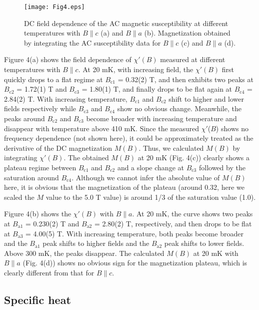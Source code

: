 \documentclass[aps,twocolumn,superscriptaddress,showpacs]{revtex4-1}
\begin{document}
\begin{figure}
\texttt{[image: Fig4.eps]}
\caption{DC field dependence of the AC magnetic susceptibility at different temperatures with $B \parallel c$ (a) and $B \parallel a$ (b). Magnetization obtained by integrating the AC susceptibility data for $B \parallel c$ (c) and $B \parallel a$ (d).}
\label{ACH}
\end{figure}

Figure 4(a) shows the field dependence of $\chi'(B)$ measured at different temperatures with $B \parallel c$. At 20 mK, with increasing field, the $\chi'(B)$ first quickly drops to a flat regime at $B_{\text{c1}}$ = 0.32(2) T, and then exhibits two peaks at $B_{\text{c2}}$ = 1.72(1) T and $B_{\text{c3}}$ = 1.80(1) T, and finally drops to be flat again at $B_{\text{c4}}$ = 2.84(2) T. With increasing temperature, $B_{\text{c1}}$ and $B_{\text{c2}}$ shift to higher and lower fields respectively while $B_{\text{c3}}$ and $B_{\text{c4}}$ show no obvious change. Meanwhile, the peaks around $B_{\text{c2}}$ and $B_{\text{c3}}$ become broader with increasing temperature and disappear with temperature above 410 mK. Since the measured $\chi'$($B$) shows no frequency dependence (not shown here), it could be approximately treated as the derivative of the DC magnetization $M(B)$. Thus, we calculated $M(B)$ by integrating $\chi'(B)$. The obtained $M(B)$ at 20 mK (Fig. 4(c)) clearly shows a plateau regime between $B_{\text{c1}}$ and $B_{\text{c2}}$ and a slope change at $B_{\text{c3}}$ followed by the saturation around $B_{\text{c4}}$. Although we cannot infer the absolute value of $M(B)$ here, it is obvious that the magnetization of the plateau (around 0.32, here we scaled the $M$ value to the 5.0 T value) is around 1/3 of the saturation value (1.0).

Figure 4(b) shows the $\chi'(B)$ with $B \parallel a$. At 20 mK, the curve shows two peaks at $B_{\text{a1}}$ = 0.230(2) T and $B_{\text{a2}}$ = 2.80(2) T, respectively, and then drops to be flat at $B_{\text{a3}}$ = 4.00(5) T. With increasing temperature, both peaks become broader and the $B_{\text{a1}}$ peak shifts to higher fields and the $B_{\text{a2}}$ peak shifts to lower fields. Above 300 mK, the peaks disappear. The calculated $M(B)$ at 20 mK with $B \parallel a$ (Fig. 4(d)) shows no obvious sign for the magnetization plateau, which is clearly different from that for $B \parallel c$.


\subsection{Specific heat}
\end{document}
